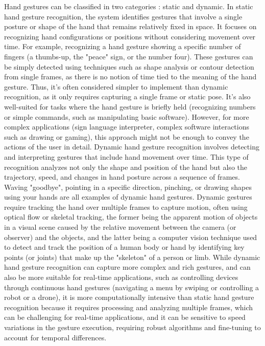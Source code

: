 \documentclass[12pt]{article}
\begin{document}
  Hand gestures can be classified in two categories : static and dynamic.
  In static hand gesture recognition, the system identifies gestures that involve a single posture or shape of the hand that remains relatively fixed in space. It focuses on recognizing hand configurations or positions without considering movement over time. For example, recognizing a hand gesture showing a specific number of fingers (a thumbs-up, the "peace" sign, or the number four). These gestures can be simply detected using techniques such as shape analysis or contour detection from single frames, as there is no notion of time tied to the meaning of the hand gesture.
  Thus, it's often considered simpler to implement than dynamic recognition, as it only requires capturing a single frame or static pose. It's also well-suited for tasks where the hand gesture is briefly held (recognizing numbers or simple commands, such as manipulating basic software). However, for more complex applications (sign language interpreter, complex software interactions such as drawing or gaming), this approach might not be enough to convey the actions of the user in detail.
  Dynamic hand gesture recognition involves detecting and interpreting gestures that include hand movement over time. This type of recognition analyzes not only the shape and position of the hand but also the trajectory, speed, and changes in hand posture across a sequence of frames. Waving "goodbye", pointing in a specific direction, pinching, or drawing shapes using your hands are all examples of dynamic hand gestures. Dynamic gestures require tracking the hand over multiple frames to capture motion, often using optical flow or skeletal tracking, the former being the apparent motion of objects in a visual scene caused by the relative movement between the camera (or observer) and the objects, and the latter being a computer vision technique used to detect and track the position of a human body or hand by identifying key points (or joints) that make up the "skeleton" of a person or limb.
  While dynamic hand gesture recognition can capture more complex and rich gestures, and can also be more suitable for real-time applications, such as controlling devices through continuous hand gestures (navigating a menu by swiping or controlling a robot or a drone), it is more computationally intensive than static hand gesture recognition because it requires processing and analyzing multiple frames, which can be challenging for real-time applications, and it can be sensitive to speed variations in the gesture execution, requiring robust algorithms and fine-tuning to account for temporal differences.
\end{document}
